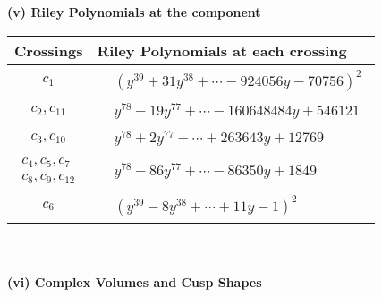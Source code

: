 \documentclass[1p]{elsarticle_modified}
\theoremstyle{definition}
\begin{document}
\newpage\renewcommand{\arraystretch}{1}
\flushleft \textbf{(v) Riley Polynomials at the component}\newline \\
\begin{tabular}{m{50pt}|m{274pt}}
Crossings & \hspace{64pt}Riley Polynomials at each crossing \\
\hline $$\begin{aligned}c_{1}\end{aligned}$$&$\begin{aligned}
&(y^{39}+31 y^{38}+\cdots-924056 y-70756)^{2}
\end{aligned}$\\
\hline $$\begin{aligned}c_{2},c_{11}\end{aligned}$$&$\begin{aligned}
&y^{78}-19 y^{77}+\cdots-160648484 y+546121
\end{aligned}$\\
\hline $$\begin{aligned}c_{3},c_{10}\end{aligned}$$&$\begin{aligned}
&y^{78}+2 y^{77}+\cdots+263643 y+12769
\end{aligned}$\\
\hline $$\begin{aligned}c_{4},c_{5},c_{7}\\c_{8},c_{9},c_{12}\end{aligned}$$&$\begin{aligned}
&y^{78}-86 y^{77}+\cdots-86350 y+1849
\end{aligned}$\\
\hline $$\begin{aligned}c_{6}\end{aligned}$$&$\begin{aligned}
&(y^{39}-8 y^{38}+\cdots+11 y-1)^{2}
\end{aligned}$\\
\hline
\end{tabular}\\~\\
\newpage\flushleft \textbf{(vi) Complex Volumes and Cusp Shapes}
\end{document}
